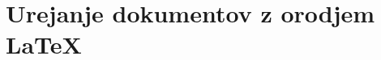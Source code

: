 \documentclass[a4paper,twoside,openright,12pt,slovene]{book}
\begin{document}

\appendix

\chapter{Urejanje dokumentov z orodjem LaTeX} \label{prilogaA}
\end{document}
